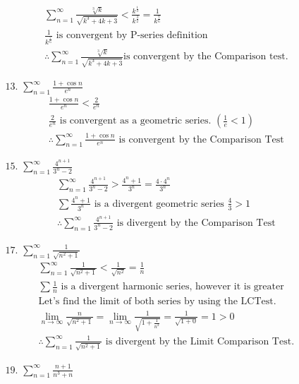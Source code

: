 \documentclass[12pt]{article}
\begin{document}
\begin{enumerate}
\begin{enumerate}
\begin{gather*}
            \sum^\infty_{n=1}\frac{\sqrt[3]{k}}{\sqrt{k^3+4k+3}}<\frac{k^\frac{1}{3}}{k^\frac{3}{2}}=\frac{1}{k^{\frac{7}{6}}}
            \\\text{$\frac{1}{k^{\frac{7}{6}}}$ is convergent by P-series definition}
            \\\text{$\therefore \sum^\infty_{n=1}\frac{\sqrt[3]{k}}{\sqrt{k^3+4k+3}} $is convergent by the Comparison test.}
        \end{gather*}
        \item[$13.$]$\sum^\infty_{n=1}\frac{1+\cos{n}}{e^n}$
        \begin{gather*}
            \frac{1+\cos{n}}{e^n} < \frac{2}{e^n}\\
            \text{$\frac{2}{e^n}$ is convergent as a geometric series. $\left(\frac{1}{e} < 1\right)$}
            \\\text{$\therefore \sum^\infty_{n=1}\frac{1+\cos{n}}{e^n}$ is convergent by the Comparison Test}
        \end{gather*}
        \item[$15.$]$\sum^\infty_{n=1}\frac{4^{n+1}}{3^n-2}$
        \begin{gather*}
            \sum^\infty_{n=1}\frac{4^{n+1}}{3^n-2} > \frac{4^n+1}{3^n}=\frac{4\cdot4^n}{3^n}
            \\\text{$\sum\frac{4^n+1}{3^n}$ is a divergent geometric series $\frac{4}{3}>1$}
            \\\text{$\therefore\sum^\infty_{n=1}\frac{4^{n+1}}{3^n-2}$ is divergent by the Comparison Test}
        \end{gather*}
        \item[$17.$]$\sum^\infty_{n=1}\frac{1}{\sqrt{n^2+1}}$
        \begin{gather*}
            \sum^\infty_{n=1}\frac{1}{\sqrt{n^2+1}}<\frac{1}{\sqrt{n^2}}=\frac{1}{n}
            \\\text{$\sum\frac{1}{n}$ is a divergent harmonic series, however it is greater}
            \\\text{Let's find the limit of both series by using the LCTest.}
            \\\lim_{n\to\infty}\frac{n}{\sqrt{n^2+1}}=\lim_{n\to\infty}\frac{1}{\sqrt{1+\frac{1}{n^2}}}=\frac{1}{\sqrt{1+0}}=1 > 0
            \\\text{$\therefore \sum^\infty_{n=1}\frac{1}{\sqrt{n^2+1}}$ is divergent by the Limit Comparison Test.}
        \end{gather*}
        \newpage\item[$19.$]$\sum^\infty_{n=1}\frac{n+1}{n^3+n}$

\end{enumerate}
\end{enumerate}
\end{document}
